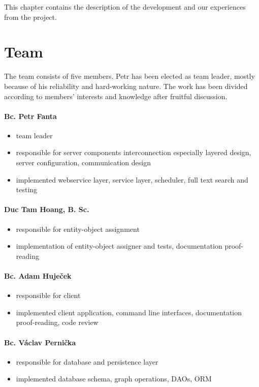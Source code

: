 This chapter contains the description of the development and our experiences
from the project.

\section{Team}

The team consists of five members. Petr has been elected as team leader,
mostly because of his reliability and hard-working nature. The work has been
divided according to members' interests and knowledge after fruitful discussion.


\paragraph{Bc. Petr Fanta}
\begin{itemize}
\item team leader
\item responsible for server components interconnection especially layered
design, server configuration, communication design
\item implemented webservice layer, service layer, scheduler, full text search and testing
\end{itemize}
\paragraph{Duc Tam Hoang, B. Sc.}
\begin{itemize}
\item responsible for entity-object assignment
\item implementation of entity-object assigner and tests, documentation
proof-reading
\end{itemize}
\paragraph{Bc. Adam Huječek}
\begin{itemize}
\item responsible for client
\item implemented client application, command line interfaces, documentation
proof-reading, code review
\end{itemize}
\paragraph{Bc. Václav Pernička}
\begin{itemize}
\item responsible for database and persistence layer
\item implemented database schema, graph operations, DAOs, ORM
\end{itemize}
